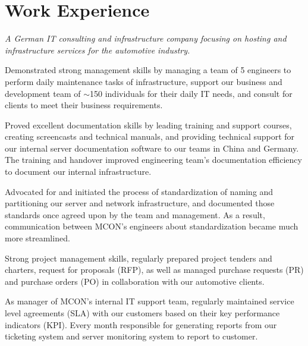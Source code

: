 \documentclass[a4paper]{deedy-resume-proximanova-sanfran} %
\begin{document}
\begin{minipage}[t]{0.66\textwidth} %


\section{Work Experience}


\emph{A German IT consulting and infrastructure company focusing on hosting and infrastructure services for the automotive industry.}
\vspace{\topsep} %
\begin{tightitemize}
\item Demonstrated strong management skills by managing a team of 5 engineers to perform daily maintenance tasks of infrastructure, support our business and development team of $\mathtt{\sim}$150 individuals for their daily IT needs, and consult for clients to meet their business requirements.
\item Proved excellent documentation skills by leading training and support courses, creating screencasts and technical manuals, and providing technical support for our internal server documentation software to our teams in China and Germany. The training and handover improved engineering team's documentation efficiency to document our internal infrastructure.
\item Advocated for and initiated the process of standardization of naming and partitioning our server and network infrastructure, and documented those standards once agreed upon by the team and management. As a result, communication between MCON's engineers about standardization became much more streamlined.
\item Strong project management skills, regularly prepared project tenders and charters, request for proposals (RFP), as well as managed purchase requests (PR) and purchase orders (PO) in collaboration with our automotive clients.
\item As manager of MCON's internal IT support team, regularly maintained service level agreements (SLA) with our customers based on their key performance indicators (KPI). Every month responsible for generating reports from our ticketing system and server monitoring system to report to customer.
\end{tightitemize}


\end{minipage}
\end{document}
